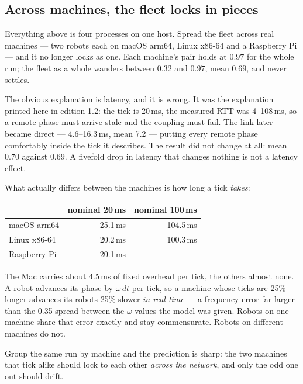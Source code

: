 \subsection{Across machines, the fleet locks in pieces}

Everything above is four processes on one host. Spread the fleet across real
machines --- two robots each on macOS arm64, Linux x86-64 and a Raspberry Pi
--- and it no longer locks as one. Each machine's pair holds at $0.97$ for the
whole run; the fleet as a whole wanders between $0.32$ and $0.97$, mean
$0.69$, and never settles.

The obvious explanation is latency, and it is wrong. It was the explanation
printed here in edition 1.2: the tick is 20\,ms, the measured RTT was
4--108\,ms, so a remote phase must arrive stale and the coupling must fail.
The link later became direct --- 4.6--16.3\,ms, mean 7.2 --- putting every
remote phase comfortably inside the tick it describes. The result did not
change at all: mean $0.70$ against $0.69$. A fivefold drop in latency that
changes nothing is not a latency effect.

What actually differs between the machines is how long a tick \emph{takes}:

\begin{center}
\footnotesize
\begin{tabular}{lrr}
\toprule
 & \textbf{nominal 20\,ms} & \textbf{nominal 100\,ms}\\
\midrule
macOS arm64        & 25.1\,ms & 104.5\,ms\\
Linux x86-64       & 20.2\,ms & 100.3\,ms\\
Raspberry Pi       & 20.1\,ms & ---\\
\bottomrule
\end{tabular}
\end{center}

\noindent The Mac carries about 4.5\,ms of fixed overhead per tick, the others
almost none. A robot advances its phase by $\omega\,dt$ per tick, so a machine
whose ticks are 25\% longer advances its robots 25\% slower \emph{in real
time} --- a frequency error far larger than the 0.35 spread between the
$\omega$ values the model was given. Robots on one machine share that error
exactly and stay commensurate. Robots on different machines do not.

Group the same run by machine and the prediction is sharp: the two machines
that tick alike should lock to each other \emph{across the network}, and only
the odd one out should drift.

